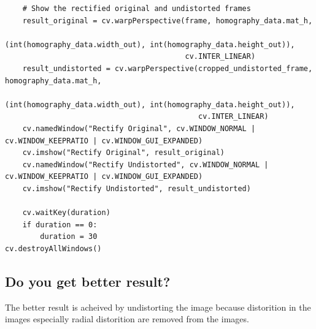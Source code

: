 \documentclass[a4paper, 12pt]{article}
\begin{document}
\begin{lstlisting}
    # Show the rectified original and undistorted frames
    result_original = cv.warpPerspective(frame, homography_data.mat_h,
                                         (int(homography_data.width_out), int(homography_data.height_out)),
                                         cv.INTER_LINEAR)
    result_undistorted = cv.warpPerspective(cropped_undistorted_frame, homography_data.mat_h,
                                            (int(homography_data.width_out), int(homography_data.height_out)),
                                            cv.INTER_LINEAR)
    cv.namedWindow("Rectify Original", cv.WINDOW_NORMAL | cv.WINDOW_KEEPRATIO | cv.WINDOW_GUI_EXPANDED)
    cv.imshow("Rectify Original", result_original)
    cv.namedWindow("Rectify Undistorted", cv.WINDOW_NORMAL | cv.WINDOW_KEEPRATIO | cv.WINDOW_GUI_EXPANDED)
    cv.imshow("Rectify Undistorted", result_undistorted)

    cv.waitKey(duration)
    if duration == 0:
        duration = 30
cv.destroyAllWindows()
	\end{lstlisting}

	\subsection{Do you get better result?}
	The better result is acheived by undistorting the image because distorition in the images especially radial distorition are removed from the images.
	
\end{document}
